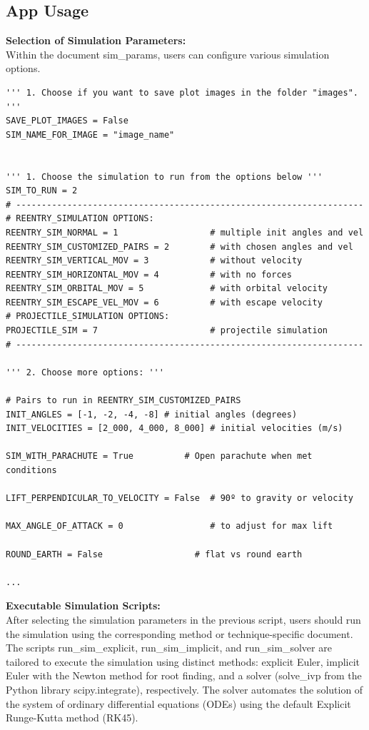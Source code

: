 \documentclass[runningheads]{llncs}
\begin{document}
\subsection{App Usage}


\textbf{Selection of Simulation Parameters:\\}
Within the document sim\_params, users can configure various simulation options.

\begin{verbatim}
''' 1. Choose if you want to save plot images in the folder "images". '''
SAVE_PLOT_IMAGES = False
SIM_NAME_FOR_IMAGE = "image_name" 


''' 1. Choose the simulation to run from the options below '''
SIM_TO_RUN = 2
# --------------------------------------------------------------------
# REENTRY_SIMULATION OPTIONS: 
REENTRY_SIM_NORMAL = 1                  # multiple init angles and vel
REENTRY_SIM_CUSTOMIZED_PAIRS = 2        # with chosen angles and vel
REENTRY_SIM_VERTICAL_MOV = 3            # without velocity 
REENTRY_SIM_HORIZONTAL_MOV = 4          # with no forces
REENTRY_SIM_ORBITAL_MOV = 5             # with orbital velocity 
REENTRY_SIM_ESCAPE_VEL_MOV = 6          # with escape velocity 
# PROJECTILE_SIMULATION OPTIONS: 
PROJECTILE_SIM = 7                      # projectile simulation
# --------------------------------------------------------------------

''' 2. Choose more options: '''

# Pairs to run in REENTRY_SIM_CUSTOMIZED_PAIRS
INIT_ANGLES = [-1, -2, -4, -8] # initial angles (degrees)
INIT_VELOCITIES = [2_000, 4_000, 8_000] # initial velocities (m/s)

SIM_WITH_PARACHUTE = True          # Open parachute when met conditions

LIFT_PERPENDICULAR_TO_VELOCITY = False  # 90º to gravity or velocity

MAX_ANGLE_OF_ATTACK = 0                 # to adjust for max lift 

ROUND_EARTH = False                  # flat vs round earth

...
\end{verbatim}

\noindent\textbf{Executable Simulation Scripts:\\}
After selecting the simulation parameters in the previous script, users should run the simulation using the corresponding method or technique-specific document. The scripts run\_sim\_explicit, run\_sim\_implicit, and run\_sim\_solver are tailored to execute the simulation using distinct methods: explicit Euler, implicit Euler with the Newton method for root finding, and a solver (solve\_ivp from the Python library scipy.integrate), respectively. The solver automates the solution of the system of ordinary differential equations (ODEs) using the default Explicit Runge-Kutta method (RK45).
\end{document}
